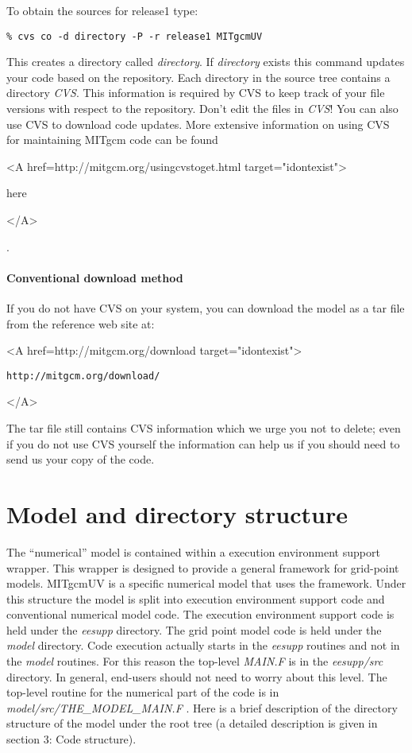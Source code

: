 To obtain the sources for release1 type:
\begin{verbatim}
% cvs co -d directory -P -r release1 MITgcmUV
\end{verbatim}

This creates a directory called \textit{directory}. If \textit{directory}
exists this command updates your code based on the repository. Each
directory in the source tree contains a directory \textit{CVS}. This
information is required by CVS to keep track of your file versions with
respect to the repository. Don't edit the files in \textit{CVS}!
You can also use CVS to download code updates.  More extensive
information on using CVS for maintaining MITgcm code can be found 
\begin{rawhtml} <A href=http://mitgcm.org/usingcvstoget.html target="idontexist"> \end{rawhtml}
here
\begin{rawhtml} </A> \end{rawhtml} 
.


\paragraph*{Conventional download method}
\label{sect:conventionalDownload}

If you do not have CVS on your system, you can download the model as a
tar file from the reference web site at:
\begin{rawhtml} <A href=http://mitgcm.org/download target="idontexist"> \end{rawhtml}
\begin{verbatim}
http://mitgcm.org/download/
\end{verbatim}
\begin{rawhtml} </A> \end{rawhtml}
The tar file still contains CVS information which we urge you not to
delete; even if you do not use CVS yourself the information can help
us if you should need to send us your copy of the code.

\section{Model and directory structure}

The ``numerical'' model is contained within a execution environment support
wrapper. This wrapper is designed to provide a general framework for
grid-point models. MITgcmUV is a specific numerical model that uses the
framework. Under this structure the model is split into execution
environment support code and conventional numerical model code. The
execution environment support code is held under the \textit{eesupp}
directory. The grid point model code is held under the \textit{model}
directory. Code execution actually starts in the \textit{eesupp} routines
and not in the \textit{model} routines. For this reason the top-level 
\textit{MAIN.F} is in the \textit{eesupp/src} directory. In general,
end-users should not need to worry about this level. The top-level routine
for the numerical part of the code is in \textit{model/src/THE\_MODEL\_MAIN.F%
}. Here is a brief description of the directory structure of the model under
the root tree (a detailed description is given in section 3: Code structure).

